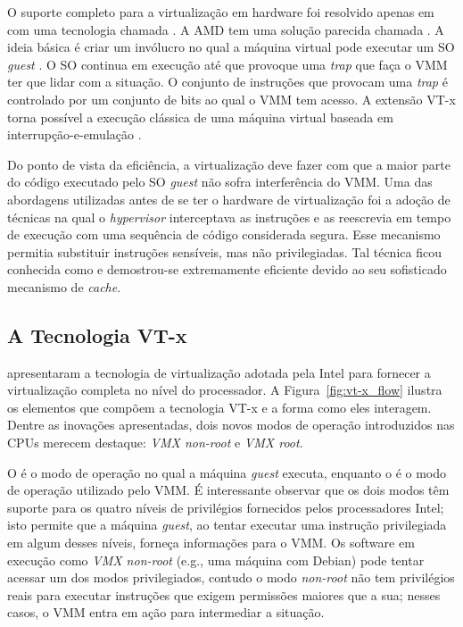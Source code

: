 O suporte completo para a virtualização em hardware foi resolvido apenas em
 \citep{uhlig} com uma tecnologia chamada
. A AMD tem uma solução parecida
chamada . A ideia básica é criar um
invólucro no qual a máquina virtual pode executar um SO \emph{guest} . O SO continua em execução até que provoque uma \emph{trap} que
faça o VMM ter que lidar com a situação. O conjunto de instruções que
provocam uma \emph{trap} é controlado por um conjunto de bits ao qual o VMM
tem acesso. A extensão VT-x torna possível a execução clássica de uma máquina
virtual baseada em interrupção-e-emulação \citep{tanenbaum}.

Do ponto de vista da eficiência, a virtualização deve fazer com que a maior
parte do código executado pelo SO \emph{guest} não sofra interferência do VMM.
Uma das abordagens utilizadas antes de se ter o hardware de virtualização foi a
adoção de técnicas na qual o \textit{hypervisor} interceptava as instruções e
as reescrevia em tempo de execução com uma sequência de código considerada
segura. Esse mecanismo permitia substituir instruções sensíveis, mas não
privilegiadas. Tal técnica ficou conhecida como 
e demostrou-se extremamente eficiente devido ao seu sofisticado mecanismo de
\emph{cache}.


\subsection{A Tecnologia VT-x}
\label{sec:vtx}

\cite{uhlig} apresentaram a tecnologia de virtualização adotada pela Intel para
fornecer a virtualização completa no nível do processador. A
Figura~\ref{fig:vt-x_flow} ilustra os elementos que compõem a tecnologia VT-x e a
forma como eles interagem. Dentre as inovações apresentadas, dois novos modos
de operação introduzidos nas CPUs merecem destaque: \emph{VMX non-root} e
\emph{VMX root}.

O  é o modo de operação no qual a máquina
\emph{guest} executa, enquanto o  é o modo de operação utilizado
pelo VMM. É interessante observar que os dois modos têm suporte para os quatro
níveis de privilégios fornecidos pelos processadores Intel; isto permite que a
máquina \emph{guest}, ao tentar executar uma instrução privilegiada em algum
desses níveis, forneça informações para o VMM. Os software em execução como
\emph{VMX non-root} (e.g., uma máquina com Debian) pode tentar acessar um dos
modos privilegiados, contudo o modo \emph{non-root} não tem privilégios reais
para executar instruções que exigem permissões maiores que a sua; nesses casos,
o VMM entra em ação para intermediar a situação.


